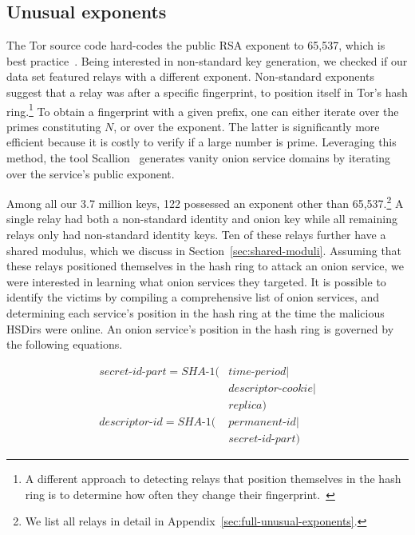 \subsection{Unusual exponents}
\label{sec:unusual-exponents}
The Tor source code hard-codes the public RSA exponent to 65,537, which is best
practice~\cite[\S~4]{Boneh1999a}.  Being interested in non-standard key
generation, we checked if our data set featured relays with a different
exponent.  Non-standard exponents suggest that a relay was after a specific
fingerprint, to position itself in Tor's hash ring.\footnote{A different
approach to detecting relays that position themselves in the hash ring is to
determine how often they change their fingerprint.~\cite[\S~4.3.3]{Winter2016a}}
To obtain a fingerprint with a given prefix, one can either iterate over the
primes constituting $N$, or over the exponent.  The latter is significantly more
efficient because it is costly to verify if a large number is prime.  Leveraging
this method, the tool Scallion~\cite{scallion} generates vanity onion service
domains by iterating over the service's public exponent.

Among all our 3.7 million keys, 122 possessed an exponent other than
65,537.\footnote{We list all relays in detail in
Appendix~\ref{sec:full-unusual-exponents}.} A single relay had both a
non-standard identity and onion key while all remaining relays only had
non-standard identity keys.  Ten of these relays further have a shared modulus,
which we discuss in Section~\ref{sec:shared-moduli}.  Assuming that these relays
positioned themselves in the hash ring to attack an onion service, we were
interested in learning what onion services they targeted.  It is possible to
identify the victims by compiling a comprehensive list of onion services, and
determining each service's position in the hash ring at the time the malicious
HSDirs were online.  An onion service's position in the hash ring is governed by
the following equations.

\begin{equation}
\begin{split}
\textit{secret-id-part} = \textit{SHA-1}(& \textit{time-period} \mid \\
                                         & \textit{descriptor-cookie} \mid \\
                                         & \textit{replica}) \\
\textit{descriptor-id} =  \textit{SHA-1}(& \textit{permanent-id} \mid \\
                                         & \textit{secret-id-part})
\end{split}
\end{equation}

